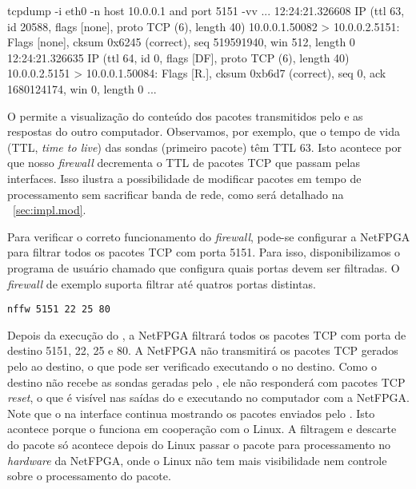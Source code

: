 \begin{verbnobox}[\small]
tcpdump -i eth0 -n host 10.0.0.1 and port 5151 -vv
...
12:24:21.326608 IP (ttl 63, id 20588, flags [none], proto TCP (6), length 40)
    10.0.0.1.50082 > 10.0.0.2.5151: Flags [none], cksum 0x6245 (correct),
                seq 519591940, win 512, length 0
12:24:21.326635 IP (ttl 64, id 0, flags [DF], proto TCP (6), length 40)
    10.0.0.2.5151 > 10.0.0.1.50084: Flags [R.], cksum 0xb6d7 (correct),
                seq 0, ack 1680124174, win 0, length 0
...
\end{verbnobox}

O  permite a visualização do conteúdo dos pacotes
transmitidos pelo  e as respostas do outro computador.
Observamos, por exemplo, que o tempo de vida (TTL, \emph{time to live})
das sondas (primeiro pacote) têm TTL 63.  Isto acontece por que nosso
\emph{firewall} decrementa o TTL de pacotes TCP que passam pelas
interfaces. Isso ilustra a possibilidade de modificar pacotes em tempo
de processamento sem sacrificar banda de rede, como será detalhado na
\secstr~\ref{sec:impl.mod}.

Para verificar o correto funcionamento do \emph{firewall}, pode-se
configurar a NetFPGA para filtrar todos os pacotes TCP com porta 5151.
Para isso, disponibilizamos o programa de usuário chamado  que
configura quais portas devem ser filtradas. O \emph{firewall} de exemplo
suporta filtrar até quatros portas distintas.

\begin{verbatim}
nffw 5151 22 25 80
\end{verbatim}

Depois da execução do , a NetFPGA filtrará todos os pacotes
TCP com porta de destino 5151, 22, 25 e 80.  A NetFPGA não transmitirá
os pacotes TCP gerados pelo  ao destino, o que pode ser
verificado executando o  no destino.  Como o destino não
recebe as sondas geradas pelo , ele não responderá com
pacotes TCP \emph{reset}, o que é visível nas saídas do  e
 executando no computador com a NetFPGA.  Note que o
 na interface  continua mostrando os pacotes
enviados pelo .  Isto acontece porque o 
funciona em cooperação com o Linux.  A filtragem e descarte do pacote só
acontece depois do Linux passar o pacote para processamento no
\emph{hardware} da NetFPGA, onde o Linux não tem mais visibilidade nem
controle sobre o processamento do pacote.

